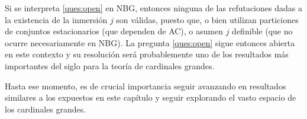 Si se interpreta \ref{ques:open} en NBG, entonces
ninguna de las refutaciones dadas a la existencia de la inmersión $j$
son válidas, puesto que, o bien utilizan particiones de conjuntos estacionarios
(que dependen de AC), o asumen $j$ definible (que no ocurre necesariamente
en NBG). La pregunta \ref{ques:open} sigue entonces abierta en este contexto
y su resolución será probablemente uno de los resultados más importantes
del siglo para la teoría de cardinales grandes.

Hasta ese momento, es de crucial importancia seguir avanzando en resultados
similares a los expuestos en este capítulo y seguir explorando el vasto espacio
de los cardinales grandes.

\fi
\backmatter
\ifreferencias
\singlespacing
{}
\printbibliography[heading=mybib]
\fi



